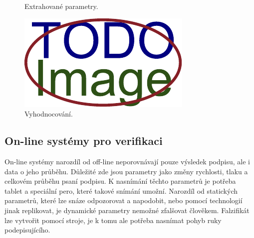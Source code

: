\begin{figure}[h]
\begin{minipage}{0.3\textwidth}
      \caption{Extrahované parametry.}
      \label{fig:second-image}
  \end{minipage}\hfill
  \begin{minipage}{0.3\textwidth}
    \centering
    \includegraphics[width=\textwidth]{obrazky-figures/placeholder.pdf}
    \caption{Vyhodnocování.}
    \label{fig:second-image}
  \end{minipage}
\end{figure}

\subsection{On-line systémy pro verifikaci} %
On-line systémy narozdíl od off-line neporovnávají pouze výsledek podpisu, ale i data o jeho průběhu.         %
Důležité zde jsou parametry jako změny rychlosti, tlaku a celkovém průběhu psaní podpisu.                     %
K nasnímání těchto parametrů je potřeba tablet a speciální pero, které takové snímání umožní.                 %
Narozdíl od statických parametrů, které lze snáze odpozorovat a napodobit,                                    %
nebo pomocí technologií jinak replikovat, je dynamické parametry nemožné zfalšovat člověkem.                  %
Falzifikát lze vytvořit pomocí stroje, je k tomu ale potřeba nasnímat pohyb ruky podepisujícího.              %


